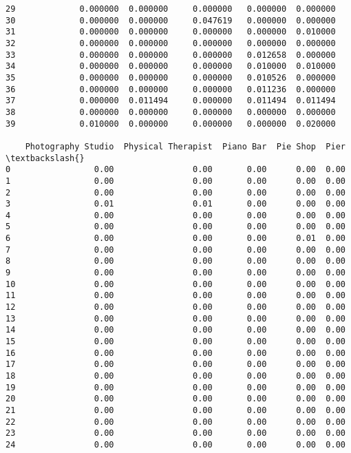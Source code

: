 \documentclass[11pt]{article}
\begin{document}
\begin{tcolorbox}[breakable, size=fbox, boxrule=.5pt, pad at break*=1mm, opacityfill=0]
\begin{Verbatim}[commandchars=\\\{\}]
29             0.000000  0.000000     0.000000   0.000000  0.000000
30             0.000000  0.000000     0.047619   0.000000  0.000000
31             0.000000  0.000000     0.000000   0.000000  0.010000
32             0.000000  0.000000     0.000000   0.000000  0.000000
33             0.000000  0.000000     0.000000   0.012658  0.000000
34             0.000000  0.000000     0.000000   0.010000  0.010000
35             0.000000  0.000000     0.000000   0.010526  0.000000
36             0.000000  0.000000     0.000000   0.011236  0.000000
37             0.000000  0.011494     0.000000   0.011494  0.011494
38             0.000000  0.000000     0.000000   0.000000  0.000000
39             0.010000  0.000000     0.000000   0.000000  0.020000

    Photography Studio  Physical Therapist  Piano Bar  Pie Shop  Pier  \textbackslash{}
0                 0.00                0.00       0.00      0.00  0.00
1                 0.00                0.00       0.00      0.00  0.00
2                 0.00                0.00       0.00      0.00  0.00
3                 0.01                0.01       0.00      0.00  0.00
4                 0.00                0.00       0.00      0.00  0.00
5                 0.00                0.00       0.00      0.00  0.00
6                 0.00                0.00       0.00      0.01  0.00
7                 0.00                0.00       0.00      0.00  0.00
8                 0.00                0.00       0.00      0.00  0.00
9                 0.00                0.00       0.00      0.00  0.00
10                0.00                0.00       0.00      0.00  0.00
11                0.00                0.00       0.00      0.00  0.00
12                0.00                0.00       0.00      0.00  0.00
13                0.00                0.00       0.00      0.00  0.00
14                0.00                0.00       0.00      0.00  0.00
15                0.00                0.00       0.00      0.00  0.00
16                0.00                0.00       0.00      0.00  0.00
17                0.00                0.00       0.00      0.00  0.00
18                0.00                0.00       0.00      0.00  0.00
19                0.00                0.00       0.00      0.00  0.00
20                0.00                0.00       0.00      0.00  0.00
21                0.00                0.00       0.00      0.00  0.00
22                0.00                0.00       0.00      0.00  0.00
23                0.00                0.00       0.00      0.00  0.00
24                0.00                0.00       0.00      0.00  0.00

\end{Verbatim}
\end{tcolorbox}
\end{document}
